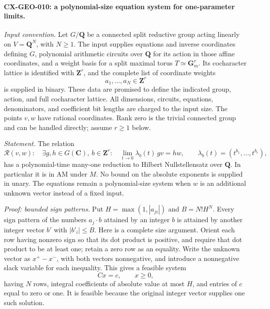 \documentclass[11pt,a4paper]{article}
\begin{document}
\paragraph{CX-GEO-010: a polynomial-size equation system for one-parameter limits.}
\emph{Input convention.} Let $G/\mathbf Q$ be a connected split reductive
group acting linearly on $V=\mathbf Q^N$, with $N\ge1$.
The input supplies equations and inverse coordinates defining $G$,
polynomial arithmetic circuits over $\mathbf Q$ for its action in those
affine coordinates, and a weight basis for a
split maximal torus $T\simeq\mathbf G_m^r$. Its cocharacter lattice is
identified with $\mathbf Z^r$, and the complete list of coordinate
weights
\[
                     a_1,\ldots,a_N\in\mathbf Z^r
\]
is supplied in binary. These data are promised to define the indicated
group, action, and full cocharacter lattice. All dimensions, circuits,
equations, denominators, and coefficient bit lengths are charged to the
input size. The points $v,w$ have rational coordinates. Rank zero is the
trivial connected group and can be handled directly; assume $r\ge1$ below.

\emph{Statement.} The relation
\[
 \mathcal R(v,w):\quad
 \exists g,h\in G(\mathbf C),\ b\in\mathbf Z^r:\quad
       \lim_{t\longrightarrow0}\lambda_b(t)\,g v=h w,
 \qquad \lambda_b(t)=(t^{b_1},\ldots,t^{b_r}),
\]
has a polynomial-time many-one reduction to Hilbert Nullstellensatz over
$\mathbf Q$. In particular it is in AM under $M$. No bound on the
absolute exponents is supplied in unary. The equations remain a
polynomial-size system when $w$ is an additional unknown vector instead
of a fixed input.

\emph{Proof: bounded sign patterns.} Put
$H=\max(1,|a_{ji}|)$ and $B=N!H^N$.
Every sign pattern of the numbers $a_j\cdot b$ attained by an integer
$b$ is attained by another integer vector $b'$ with $|b'_i|\le B$.
Here is a complete size argument. Orient each row having nonzero sign
so that its dot product is positive, and require that dot product to be
at least one; retain a zero row as an equality. Write the unknown vector
as $x^+-x^-$, with both vectors nonnegative, and introduce a nonnegative
slack variable for each inequality. This gives a feasible system
\[
                       Cx=c,\qquad x\ge0,
\]
having $N$ rows, integral coefficients of absolute value at most $H$,
and entries of $c$ equal to zero or one. It is feasible because the
original integer vector supplies one such solution.
\end{document}
